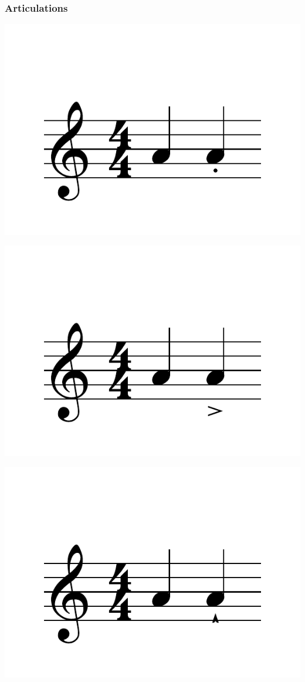 \documentclass{article}
\begin{document}
\subsubsection{Articulations}
\includegraphics[scale=0.5]{figures_tests/pdf/skern/articulations0.pdf}

\includegraphics[scale=0.5]{figures_tests/pdf/skern/articulations1.pdf}

\includegraphics[scale=0.5]{figures_tests/pdf/skern/articulations2.pdf}
\end{document}
